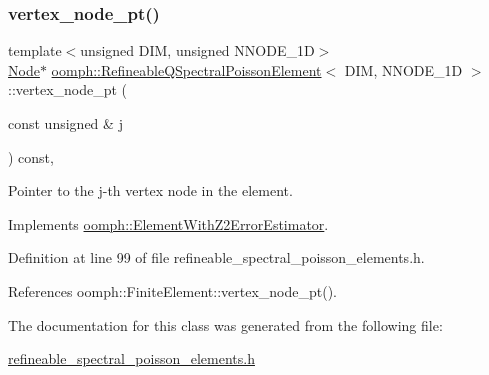 \subsubsection{\texorpdfstring{vertex\+\_\+node\+\_\+pt()}{vertex\_node\_pt()}}
{\footnotesize\ttfamily template$<$unsigned D\+IM, unsigned N\+N\+O\+D\+E\+\_\+1D$>$ \\
\hyperlink{classoomph_1_1Node}{Node}$\ast$ \hyperlink{classoomph_1_1RefineableQSpectralPoissonElement}{oomph\+::\+Refineable\+Q\+Spectral\+Poisson\+Element}$<$ D\+IM, N\+N\+O\+D\+E\+\_\+1D $>$\+::vertex\+\_\+node\+\_\+pt (\begin{DoxyParamCaption}\item[{const unsigned \&}]{j }\end{DoxyParamCaption}) const\hspace{0.3cm}{\ttfamily [inline]}, {\ttfamily [virtual]}}



Pointer to the j-\/th vertex node in the element. 



Implements \hyperlink{classoomph_1_1ElementWithZ2ErrorEstimator_a0eedccc33519f852c5dc2055ddf2774b}{oomph\+::\+Element\+With\+Z2\+Error\+Estimator}.



Definition at line 99 of file refineable\+\_\+spectral\+\_\+poisson\+\_\+elements.\+h.



References oomph\+::\+Finite\+Element\+::vertex\+\_\+node\+\_\+pt().



The documentation for this class was generated from the following file\+:\begin{DoxyCompactItemize}
\item 
\hyperlink{refineable__spectral__poisson__elements_8h}{refineable\+\_\+spectral\+\_\+poisson\+\_\+elements.\+h}\end{DoxyCompactItemize}
